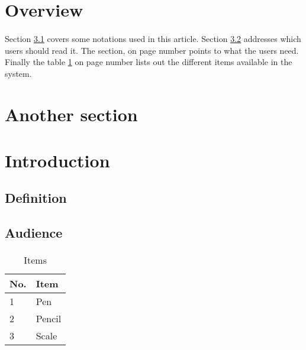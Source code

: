\documentclass{article}
\begin{document}
	
	
	\section{Overview}
	\paragraph{}
	Section \ref{subsec:def} covers some notations used in this article. Section \ref{subsec:audience} addresses which users should read it. The section,  on page number \pageref{subsec:requirement} points to what the users need. Finally the table \ref{tbl:items} on page number \pageref{tbl:items} lists out the different items available in the system.
	
	\section{Another section}
	\lipsum[1-4]
	
	\section{Introduction}
	\label{sec:intro}
	\paragraph{}
	\lipsum[1-2]
	
	\subsection{Definition}
	\label{subsec:def}
	\paragraph{}
	\lipsum[1-2]
	
	\subsection{Audience}
	\label{subsec:audience}
	\paragraph{}
	\lipsum[1-2]
	\begin{table}[h]
		\centering
		\begin{tabular}{ll}
			\hline
			No. & Item \\
			\hline
			1 & Pen \\
			2 & Pencil \\
			3 & Scale \\
			\hline
		\end{tabular}
		\caption{Items}
		\label{tbl:items}
	\end{table}
	
\end{document}
